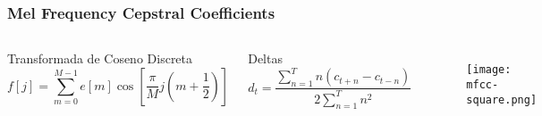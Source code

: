 \begin{frame}
    \frametitle{Mel Frequency Cepstral Coefficients}

    \begin{columns}

        \begin{block}{Transformada de Coseno Discreta}
        {\small
        \begin{equation*}
            f[j] = \sum_{m=0}^{M-1}{e[m]\cos{\left[ \frac{\pi}{M}j\left( m + \frac{1}{2} \right) \right]}}
        \end{equation*}
        }
        \end{block}

        \begin{block}{Deltas}
        {\small
        \begin{equation*}
            d_t = \frac{\sum_{n=1}^{T}{n(c_{t+n} - c_{t-n})}}{2\sum_{n=1}^{T}{n^2}}
        \end{equation*}
        }
        \end{block}


        \begin{figure}[!h]
            \centering
            \texttt{[image: mfcc-square.png]}
        \end{figure}

    \end{columns}
\end{frame}

